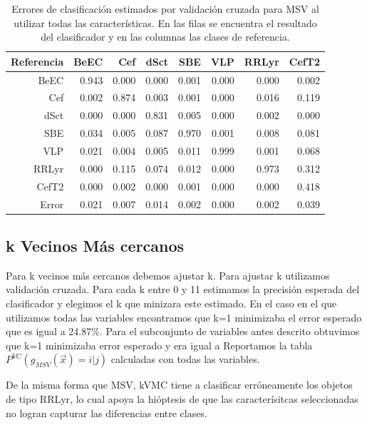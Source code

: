 \documentclass[letterpaper,12pt]{book}
\begin{document}
\begin{table}[ht]
  \centering
  \begin{tabular}{rrrrrrrr}
    \hline
    \hline
    Referencia & BeEC & Cef & dSct & SBE & VLP & RRLyr & CefT2 \\ 
    \hline
    \hline
    BeEC & 0.943 & 0.000 & 0.000 & 0.001 & 0.000 & 0.000 & 0.002 \\ 
    Cef & 0.002 & 0.874 & 0.003 & 0.001 & 0.000 & 0.016 & 0.119 \\ 
    dSct & 0.000 & 0.000 & 0.831 & 0.005 & 0.000 & 0.002 & 0.000 \\ 
    SBE & 0.034 & 0.005 & 0.087 & 0.970 & 0.001 & 0.008 & 0.081 \\ 
    VLP & 0.021 & 0.004 & 0.005 & 0.011 & 0.999 & 0.001 & 0.068 \\ 
    RRLyr & 0.000 & 0.115 & 0.074 & 0.012 & 0.000 & 0.973 & 0.312 \\ 
    CefT2 & 0.000 & 0.002 & 0.000 & 0.001 & 0.000 & 0.000 & 0.418 \\ 
    \hline 
    \hline
    Error & 0.021 & 0.007 & 0.014 & 0.002 & 0.000 & 0.002 & 0.039 \\ 
    \hline
    \hline
  \end{tabular}
  \caption{Errores de clasificación estimados por validación cruzada para MSV al utilizar todas las características. En las filas se encuentra el resultado del clasificador y en las columnas las clases de referencia.  }
  \label{cuadro:erroresTodasVariablesSVM}
\end{table}

\subsection{k Vecinos Más cercanos}

Para k vecinos más cercanos debemos ajustar k. Para ajustar k utilizamos validación cruzada. Para cada k entre 0 y 11 estimamos la precisión esperada del clasificador y elegimos el k que minizara este estimado. En el caso en el que utilizamos todas las variables encontramos que  k=1 minimizaba el error esperado que es igual a 24.87\%. Para el subconjunto de variables antes descrito obtuvimos que k=1 minimizaba error esperado y era igual a  Reportamos la tabla $P^{VC}(g_{MSV}(\vec{x})=i|j)$ calculadas con todas las variables. 

De la misma forma que MSV, kVMC tiene a clasificar erróneamente los objetos de tipo RRLyr, lo cual apoya la hióptesis de que las caracterísitcas seleccionadas no logran capturar las diferencias entre clases. 
\end{document}
